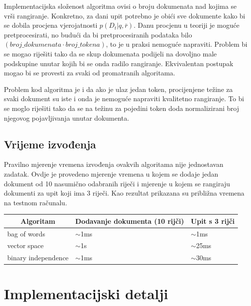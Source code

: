 \documentclass[a4paper,12pt]{article}
\begin{document}
Implementacijska složenost algoritma ovisi o broju dokumenata nad kojima se vrši rangiranje. Konkretno, za dani upit potrebno je obići sve dokumente kako bi se dobila procjena vjerojatnosti $p(D_t|q, \bar r)$. Danu procjenu u teoriji je moguće pretprocesirati, no budući da bi pretprocesiranih podataka bilo $(broj\_dokumenata \cdot broj\_tokena)$, to je u praksi nemoguće napraviti. Problem bi se mogao riješiti tako da se skup dokumenata podijeli na dovoljno male podskupine unutar kojih bi se onda radilo rangiranje. Ekvivalentan postupak mogao bi se provesti za svaki od promatranih algoritama.

Problem kod algoritma je i da ako je ulaz jedan token, procijenjene težine za svaki dokument su iste i onda je nemoguće napraviti kvalitetno rangiranje. To bi se moglo riješiti tako da se na težinu za pojedini token doda normalizirani broj njegovog pojavljivanja unutar dokumenta.

\subsection{Vrijeme izvođenja}

Pravilno mjerenje vremena izvođenja ovakvih algoritama nije jednostavan zadatak. Ovdje je provedeno mjerenje vremena u kojem se dodaje jedan dokument od 10 nasumično odabranih riječi i mjerenje u kojem se rangiraju dokumenti za upit koji ima 3 riječi. Kao rezultat prikazana su približna vremena na testnom računalu.

\vspace{0.3cm}

\begin{center}
    \begin{tabular}{ | p{4cm} | p{4.5cm} | p{4cm} |}
    \hline 
    \multicolumn{1}{|c|}{\textbf{Algoritam}} & \multicolumn{1}{c|}{\textbf{Dodavanje dokumenta (10 rijči)}} & \multicolumn{1}{c|}{\textbf{Upit s 3 rijči}}\\
    \hline bag of words & $\sim$1ms & $\sim$1ms \\ 
    \hline vector space & $\sim$1s & $\sim$25ms \\
    \hline binary independence & $\sim$1ms & $\sim$30ms \\
    \hline
    \end{tabular}
\end{center}

\section{Implementacijski detalji}
\end{document}
